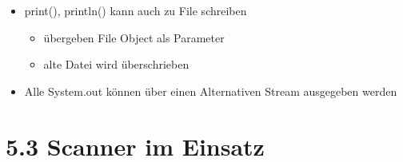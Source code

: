 \documentclass[11pt]{article}
\begin{document}
\begin{itemize}
\item print(), println() kann auch zu File schreiben\\
\begin{itemize}
\item übergeben File Object als Parameter\\
\item alte Datei wird überschrieben\\
\end{itemize}

\item Alle System.out können über einen Alternativen Stream ausgegeben werden\\
\end{itemize}

\section{5.3 Scanner im Einsatz}
\label{sec:org885742c}
\end{document}
